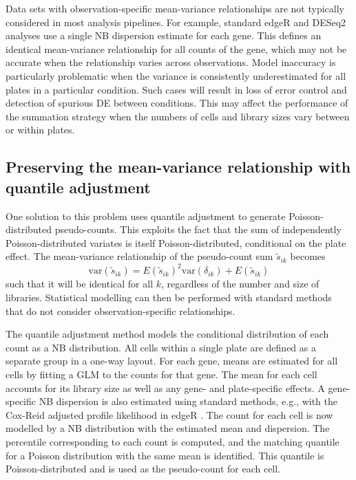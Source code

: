 \documentclass{article}
\begin{document}
Data sets with observation-specific mean-variance relationships are not typically considered in most analysis pipelines.
For example, standard edgeR and DESeq2 analyses use a single NB dispersion estimate for each gene.
This defines an identical mean-variance relationship for all counts of the gene, which may not be accurate when the relationship varies across observations.
Model inaccuracy is particularly problematic when the variance is consistently underestimated for all plates in a particular condition.
Such cases will result in loss of error control and detection of spurious DE between conditions.
This may affect the performance of the summation strategy when the numbers of cells and library sizes vary between or within plates.

\subsection{Preserving the mean-variance relationship with quantile adjustment}
One solution to this problem uses quantile adjustment \cite{robinson2008small} to generate Poisson-distributed pseudo-counts.
This exploits the fact that the sum of independently Poisson-distributed variates is itself Poisson-distributed, conditional on the plate effect.
The mean-variance relationship of the pseudo-count sum $\tilde{s}_{ik}$ becomes 
\[
    \mbox{var}(\tilde{s}_{ik}) = E(\tilde{s}_{ik})^2 \mbox{var}(\delta_{ik}) + E(\tilde{s}_{ik}) 
\]
such that it will be identical for all $k$, regardless of the number and size of libraries.
Statistical modelling can then be performed with standard methods that do not consider observation-specific relationships.

The quantile adjustment method models the conditional distribution of each count as a NB distribution.
All cells within a single plate are defined as a separate group in a one-way layout.
For each gene, means are estimated for all cells by fitting a GLM to the counts for that gene.
The mean for each cell accounts for its library size as well as any gene- and plate-specific effects.
A gene-specific NB dispersion is also estimated using standard methods, e.g., with the Cox-Reid adjusted profile likelihood in edgeR \cite{mccarthy2012differential}.
The count for each cell is now modelled by a NB distribution with the estimated mean and dispersion.
The percentile corresponding to each count is computed, and the matching quantile for a Poisson distribution with the same mean is identified.
This quantile is Poisson-distributed and is used as the pseudo-count for each cell.
\end{document}

